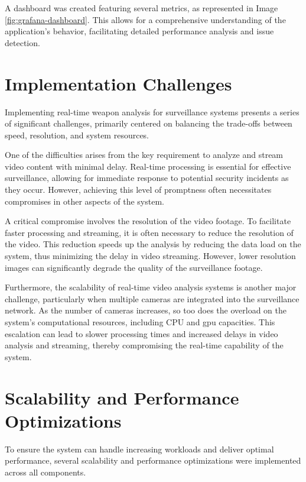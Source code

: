A dashboard was created featuring several metrics, as represented in Image \ref{fig:grafana-dashboard}. This allows for 
a comprehensive understanding of the application's behavior, facilitating detailed performance analysis and issue 
detection.

\section{Implementation Challenges}
Implementing real-time weapon analysis for surveillance systems presents a series of significant challenges, 
primarily centered on balancing the trade-offs between speed, resolution, and system resources.

One of the difficulties arises from the key requirement to analyze and stream video content with minimal delay. 
Real-time processing is essential for effective surveillance, allowing for immediate response to potential security 
incidents as they occur. However, achieving this level of promptness often necessitates compromises in other aspects 
of the system.

A critical compromise involves the resolution of the video footage. To facilitate faster processing and streaming, 
it is often necessary to reduce the resolution of the video. This reduction speeds up the analysis by reducing the 
data load on the system, thus minimizing the delay in video streaming. However, lower resolution images can significantly 
degrade the quality of the surveillance footage.

Furthermore, the scalability of real-time video analysis systems is another major challenge, particularly when multiple 
cameras are integrated into the surveillance network. As the number of cameras increases, so too does the overload on the 
system's computational resources, including CPU and \ac{gpu} capacities. This escalation can lead to slower processing times 
and increased delays in video analysis and streaming, thereby compromising the real-time capability of the system.
\section{Scalability and Performance Optimizations}
To ensure the system can handle increasing workloads and deliver optimal performance, several 
scalability and performance optimizations were implemented across all components.

